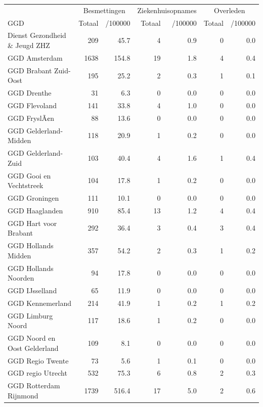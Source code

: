 \documentclass[
  english,
  man,floatsintext]{apa6}
\begin{document}
\begin{table}[H]
\centering\begingroup\fontsize{10}{12}\selectfont

\begin{threeparttable}
\begin{tabular}{lrrrrrr}
\toprule
\multicolumn{1}{c}{ } & \multicolumn{2}{c}{Besmettingen} & \multicolumn{2}{c}{Ziekenhuisopnames} & \multicolumn{2}{c}{Overleden} \\
\cmidrule(l{3pt}r{3pt}){2-3} \cmidrule(l{3pt}r{3pt}){4-5} \cmidrule(l{3pt}r{3pt}){6-7}
GGD & Totaal & /100000 & Totaal & /100000 & Totaal & /100000\\
\midrule
Dienst Gezondheid \& Jeugd ZHZ & 209 & 45.7 & 4 & 0.9 & 0 & 0.0\\
GGD Amsterdam & 1638 & 154.8 & 19 & 1.8 & 4 & 0.4\\
GGD Brabant Zuid-Oost & 195 & 25.2 & 2 & 0.3 & 1 & 0.1\\
GGD Drenthe & 31 & 6.3 & 0 & 0.0 & 0 & 0.0\\
GGD Flevoland & 141 & 33.8 & 4 & 1.0 & 0 & 0.0\\
GGD FryslÃ¢n & 88 & 13.6 & 0 & 0.0 & 0 & 0.0\\
GGD Gelderland-Midden & 118 & 20.9 & 1 & 0.2 & 0 & 0.0\\
GGD Gelderland-Zuid & 103 & 40.4 & 4 & 1.6 & 1 & 0.4\\
GGD Gooi en Vechtstreek & 104 & 17.8 & 1 & 0.2 & 0 & 0.0\\
GGD Groningen & 111 & 10.1 & 0 & 0.0 & 0 & 0.0\\
GGD Haaglanden & 910 & 85.4 & 13 & 1.2 & 4 & 0.4\\
GGD Hart voor Brabant & 292 & 36.4 & 3 & 0.4 & 3 & 0.4\\
GGD Hollands Midden & 357 & 54.2 & 2 & 0.3 & 1 & 0.2\\
GGD Hollands Noorden & 94 & 17.8 & 0 & 0.0 & 0 & 0.0\\
GGD IJsselland & 65 & 11.9 & 0 & 0.0 & 0 & 0.0\\
GGD Kennemerland & 214 & 41.9 & 1 & 0.2 & 1 & 0.2\\
GGD Limburg Noord & 117 & 18.6 & 1 & 0.2 & 0 & 0.0\\
GGD Noord en Oost Gelderland & 109 & 8.1 & 0 & 0.0 & 0 & 0.0\\
GGD Regio Twente & 73 & 5.6 & 1 & 0.1 & 0 & 0.0\\
GGD regio Utrecht & 532 & 75.3 & 6 & 0.8 & 2 & 0.3\\
GGD Rotterdam Rijnmond & 1739 & 516.4 & 17 & 5.0 & 2 & 0.6\\

\end{tabular}
\end{threeparttable}
\end{table}
\end{document}
